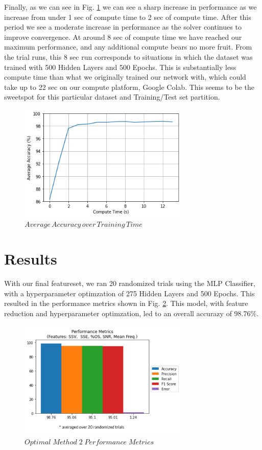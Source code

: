\documentclass[conference]{IEEEtran}
\begin{document}
Finally, as we can see in  Fig. \ref{fig:TimePerf} we can see a sharp increase in performance as we increase from under 1 sec of compute time to 2 sec of compute time. After this period we see a moderate increase in performance as the solver continues to improve convergence. At around 8 sec of compute time we have reached our maximum performance, and any additional compute bears no more fruit. From the trial runs, this 8 sec run corresponds to situations in which the dataset was trained with 500 Hidden Layers and 500 Epochs. This is substantially less compute time than what we originally trained our network with, which could take up to 22 sec on our compute platform, Google Colab. This seems to be the sweetspot for this particular dataset and Training/Test set partition.

\begin{figure}[htb]
\centering
\includegraphics[width=3.2in]{figures/72_aa_vs_comp_time.png}
\caption{$Average\,Accuracy\,over\,Training\,Time$}
\label{fig:TimePerf}
\end{figure}



\section{Results}
With our final featureset, we ran 20 randomized trials using the MLP Classifier, with a hyperparameter optimzation of 275 Hidden Layers and 500 Epochs. This resulted in the performance metrics shown in Fig. \ref{fig:M2opt}. This model, with feature reduction and hyperparameter optimzation, led to an overall accurazy of 98.76\%.

\begin{figure}[htb]
\centering
\includegraphics[width=3.2in]{figures/100_m2optperf.png}
\caption{$Optimal\;Method\;2\;Performance\;Metrics$}
\label{fig:M2opt}
\end{figure}
\end{document}

